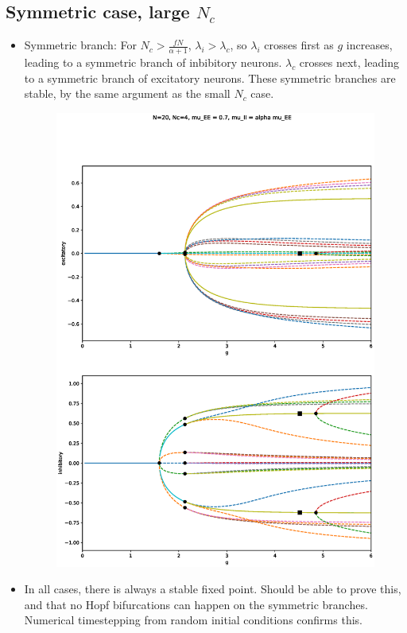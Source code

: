 \documentclass[11pt,reqno]{amsart}
\begin{document}
\subsection{Symmetric case, large $N_c$}
\begin{itemize}
    \item Symmetric branch: For $N_c > \frac{fN}{\alpha+1
    }$, $\lambda_i > \lambda_c$, so $\lambda_i$ crosses first as $g$ increases, leading to a symmetric branch of inbibitory neurons. $\lambda_c$ crosses next, leading to a symmetric branch of excitatory neurons. These symmetric branches are stable, by the same argument as the small $N_c$ case.
    
    \begin{figure}[H]
    \centering
    \includegraphics[width=14cm]{images/BD4_c20_E07.eps}
    \end{figure}
     
    \item In all cases, there is always a stable fixed point. Should be able to prove this, and that no Hopf bifurcations can happen on the symmetric branches. Numerical timestepping from random initial conditions confirms this.

\end{itemize}
\end{document}
